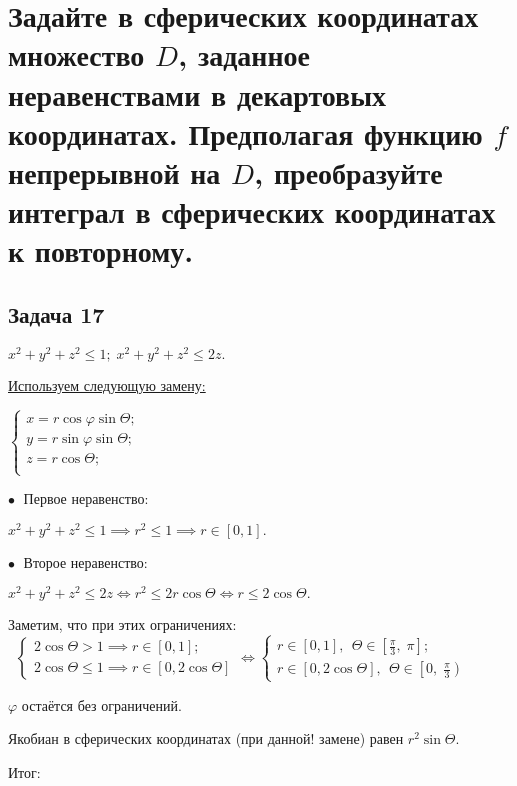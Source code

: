\documentclass[a4paper, fleqn]{article}
\begin{document}
    
    \section*{Задайте в сферических координатах множество $D$, заданное неравенствами в декартовых координатах.
    Предполагая функцию $f$ непрерывной на $D$, преобразуйте интеграл в сферических координатах к повторному.}
    
    
    \subsection*{Задача 17}
    
    $x^2 + y^2 + z^2 \leq 1; \; x^2 + y^2 + z^2 \leq 2z.$
    
    \underline{Используем следующую замену:}
    
    $\begin{cases}
    x = r \cos \varphi \sin \Theta;\\
    y = r \sin \varphi \sin \Theta;\\
    z = r  \cos \Theta;\\
    \end{cases}$
    
    $\bullet \; $ Первое неравенство:
    
    $x^2 + y^2 + z^2 \leq 1 \implies r^2 \leq 1 \implies r \in [0,1].$
    
    $\bullet \; $ Второе неравенство:
    
    $x^2 + y^2 + z^2 \leq 2z \iff r^2 \leq 2 r \cos \Theta \iff r \leq 2 \cos \Theta.$
    
    Заметим, что при этих ограничениях: $\; \; \begin{cases} 
    2 \cos \Theta > 1 \implies r \in [0,1];\\
    2 \cos \Theta \leq 1 \implies r \in [0, 2 \cos \Theta]
    \end{cases} \iff 
    \begin{cases} 
    r \in [0,1], \; \, \Theta \in \left[\frac{\pi}{3}, \; \pi \right];\\
    r \in \left[0, 2 \cos \Theta \right], \; \, \Theta \in \left[0, \; \frac{\pi}{3} \right)
    \end{cases}$
    
    $\varphi$ остаётся без ограничений.
    
    Якобиан в сферических координатах (при данной! замене) равен $r^2 \sin \Theta.$
    
    Итог:
    
\end{document}
